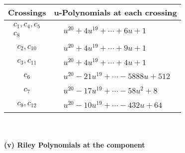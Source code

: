 \documentclass[1p]{elsarticle_modified}
\theoremstyle{definition}
\begin{document}
\begin{tabular}{m{50pt}|m{274pt}}
Crossings & \hspace{64pt}u-Polynomials at each crossing \\
\hline $$\begin{aligned}c_{1},c_{4},c_{5}\\c_{8}\end{aligned}$$&$\begin{aligned}
&u^{20}+4 u^{19}+\cdots+6 u+1
\end{aligned}$\\
\hline $$\begin{aligned}c_{2},c_{10}\end{aligned}$$&$\begin{aligned}
&u^{20}+4 u^{19}+\cdots+9 u+1
\end{aligned}$\\
\hline $$\begin{aligned}c_{3},c_{11}\end{aligned}$$&$\begin{aligned}
&u^{20}+4 u^{19}+\cdots+4 u+1
\end{aligned}$\\
\hline $$\begin{aligned}c_{6}\end{aligned}$$&$\begin{aligned}
&u^{20}-21 u^{19}+\cdots-5888 u+512
\end{aligned}$\\
\hline $$\begin{aligned}c_{7}\end{aligned}$$&$\begin{aligned}
&u^{20}-17 u^{19}+\cdots-58 u^2+8
\end{aligned}$\\
\hline $$\begin{aligned}c_{9},c_{12}\end{aligned}$$&$\begin{aligned}
&u^{20}-10 u^{19}+\cdots-432 u+64
\end{aligned}$\\
\hline
\end{tabular}\\~\\
\newpage\renewcommand{\arraystretch}{1}
\flushleft \textbf{(v) Riley Polynomials at the component}\newline \\
\end{document}
